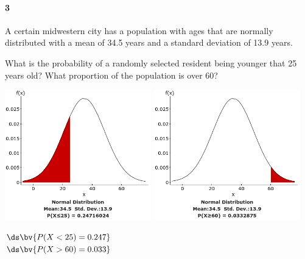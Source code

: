 \documentclass{article}
\begin{document}
\begin{flushleft}
\paragraph{3} A certain midwestern city has a population with ages that are normally distributed with a mean of 34.5 years and a standard deviation of 13.9 years.
\begin{enumalpha}
\item What is the probability of a randomly selected resident being younger that 25 years old? What proportion of the population is over 60?\\
\medskip
{\centering
\includegraphics[width=2.5in]{images/grp06_Q3_a_1} \qquad
\includegraphics[width=2.5in]{images/grp06_Q3_a_2}
\par}
$\ds\bv{P(X < 25) = 0.247}$\\
\medskip
$\ds\bv{P(X > 60) = 0.033}$
\vspace{.5in}


\end{enumalpha}
\end{flushleft}
\end{document}
